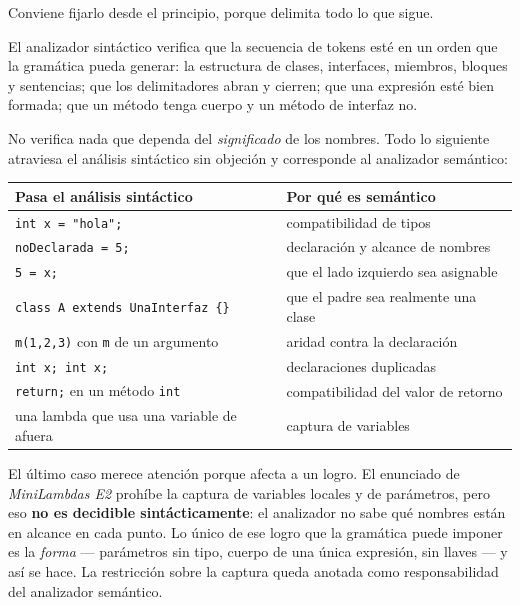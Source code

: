 Conviene fijarlo desde el principio, porque delimita todo lo que sigue.

El analizador sintáctico verifica que la secuencia de tokens esté en un orden que la gramática
pueda generar: la estructura de clases, interfaces, miembros, bloques y sentencias; que los
delimitadores abran y cierren; que una expresión esté bien formada; que un método tenga cuerpo y
un método de interfaz no.

No verifica nada que dependa del \emph{significado} de los nombres. Todo lo siguiente atraviesa el
análisis sintáctico sin objeción y corresponde al analizador semántico:

\begin{center}
\begin{tabular}{@{}p{}p{}@{}}
\toprule
\textbf{Pasa el análisis sintáctico} & \textbf{Por qué es semántico} \\
\midrule
\texttt{int x = "hola";}                    & compatibilidad de tipos \\
\texttt{noDeclarada = 5;}                   & declaración y alcance de nombres \\
\texttt{5 = x;}                             & que el lado izquierdo sea asignable \\
\texttt{class A extends UnaInterfaz \{\}}   & que el padre sea realmente una clase \\
\texttt{m(1,2,3)} con \texttt{m} de un argumento & aridad contra la declaración \\
\texttt{int x; int x;}                      & declaraciones duplicadas \\
\texttt{return;} en un método \texttt{int}  & compatibilidad del valor de retorno \\
una lambda que usa una variable de afuera   & captura de variables \\
\bottomrule
\end{tabular}
\end{center}

El último caso merece atención porque afecta a un logro. El enunciado de \emph{MiniLambdas E2}
prohíbe la captura de variables locales y de parámetros, pero eso \textbf{no es decidible
sintácticamente}: el analizador no sabe qué nombres están en alcance en cada punto. Lo único de
ese logro que la gramática puede imponer es la \emph{forma} --- parámetros sin tipo, cuerpo de una
única expresión, sin llaves --- y así se hace. La restricción sobre la captura queda anotada como
responsabilidad del analizador semántico.
